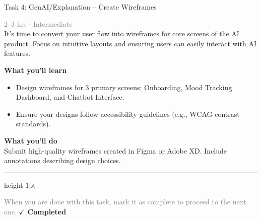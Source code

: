 \documentclass[10pt,a4paper]{article}
\begin{document}
\begin{taskbox}{Task 4: GenAI/Explanation – Create Wireframes}

    {\small \textcolor{gray}{2--3 hrs $\cdot$ Intermediate}}\\[12pt]

      
It’s time to convert your user flow into wireframes for core screens of the AI product. Focus on intuitive layouts and ensuring users can easily interact with AI features.


\vspace{8pt}
{\large \textbf{\textcolor{brandLight}{What you'll learn}}}\\[4pt]  
\begin{itemize}
    \item Design wireframes for 3 primary screens: Onboarding, Mood Tracking Dashboard, and Chatbot Interface.  
    \item Ensure your designs follow accessibility guidelines (e.g., WCAG contrast standards).
\end{itemize}

\vspace{8pt}
{\large \textbf{\textcolor{brandLight}{What you'll do}}}\\[4pt]  
Submit high-quality wireframes created in Figma or Adobe XD. Include annotations describing design choices.\par

    \vspace{16pt}

    \textcolor{cardBorder}{\hrule height 1pt}\vspace{8pt}

    \small \textcolor{gray}{When you are done with this task, mark it as complete to proceed to the next one.} \hfill \textbf{\textcolor{brandDark}{$\checkmark$ Completed}}

\end{taskbox}
\end{document}
